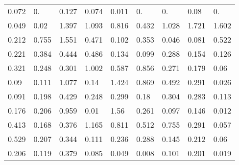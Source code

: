\begin{tabular}{|lllllllll|}
\color[HTML]{808080}0.072 & \color[HTML]{909090}0. & \color[HTML]{606060}0.127 & \color[HTML]{808080}0.074 & \color[HTML]{909090}0.011 & \color[HTML]{909090}0. & \color[HTML]{909090}0. & \color[HTML]{707070}0.08 & \color[HTML]{909090}0. \\ 
\color[HTML]{808080}0.049 & \color[HTML]{909090}0.02 & \color[HTML]{000000}1.397 & \color[HTML]{000000}1.093 & \color[HTML]{000000}0.816 & \color[HTML]{000000}0.432 & \color[HTML]{000000}1.028 & \color[HTML]{000000}1.721 & \color[HTML]{000000}1.602 \\ 
\color[HTML]{505050}0.212 & \color[HTML]{000000}0.755 & \color[HTML]{000000}1.551 & \color[HTML]{000000}0.471 & \color[HTML]{707070}0.102 & \color[HTML]{202020}0.353 & \color[HTML]{808080}0.046 & \color[HTML]{707070}0.081 & \color[HTML]{000000}0.522 \\ 
\color[HTML]{505050}0.221 & \color[HTML]{101010}0.384 & \color[HTML]{000000}0.444 & \color[HTML]{000000}0.486 & \color[HTML]{606060}0.134 & \color[HTML]{707070}0.099 & \color[HTML]{303030}0.288 & \color[HTML]{606060}0.154 & \color[HTML]{606060}0.126 \\ 
\color[HTML]{303030}0.321 & \color[HTML]{404040}0.248 & \color[HTML]{303030}0.301 & \color[HTML]{000000}1.002 & \color[HTML]{000000}0.587 & \color[HTML]{000000}0.856 & \color[HTML]{404040}0.271 & \color[HTML]{505050}0.179 & \color[HTML]{808080}0.06 \\ 
\color[HTML]{707070}0.09 & \color[HTML]{707070}0.111 & \color[HTML]{000000}1.077 & \color[HTML]{606060}0.14 & \color[HTML]{000000}1.424 & \color[HTML]{000000}0.869 & \color[HTML]{000000}0.492 & \color[HTML]{303030}0.291 & \color[HTML]{808080}0.026 \\ 
\color[HTML]{707070}0.091 & \color[HTML]{505050}0.198 & \color[HTML]{000000}0.429 & \color[HTML]{404040}0.248 & \color[HTML]{303030}0.299 & \color[HTML]{505050}0.18 & \color[HTML]{303030}0.304 & \color[HTML]{303030}0.283 & \color[HTML]{707070}0.113 \\ 
\color[HTML]{505050}0.176 & \color[HTML]{505050}0.206 & \color[HTML]{000000}0.959 & \color[HTML]{909090}0.01 & \color[HTML]{000000}1.56 & \color[HTML]{404040}0.261 & \color[HTML]{707070}0.097 & \color[HTML]{606060}0.146 & \color[HTML]{909090}0.012 \\ 
\color[HTML]{101010}0.413 & \color[HTML]{606060}0.168 & \color[HTML]{101010}0.376 & \color[HTML]{000000}1.165 & \color[HTML]{000000}0.811 & \color[HTML]{000000}0.512 & \color[HTML]{000000}0.755 & \color[HTML]{303030}0.291 & \color[HTML]{808080}0.057 \\ 
\color[HTML]{000000}0.529 & \color[HTML]{505050}0.207 & \color[HTML]{202020}0.344 & \color[HTML]{707070}0.111 & \color[HTML]{404040}0.236 & \color[HTML]{303030}0.288 & \color[HTML]{606060}0.145 & \color[HTML]{505050}0.212 & \color[HTML]{808080}0.06 \\ 
\color[HTML]{505050}0.206 & \color[HTML]{707070}0.119 & \color[HTML]{101010}0.379 & \color[HTML]{707070}0.085 & \color[HTML]{808080}0.049 & \color[HTML]{909090}0.008 & \color[HTML]{707070}0.101 & \color[HTML]{505050}0.201 & \color[HTML]{909090}0.019
\end{tabular}
